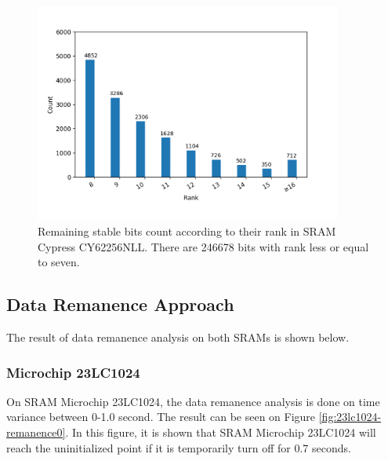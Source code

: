 \begin{figure}[tph!]
    \centerline{\includegraphics[width={0.9\textwidth}]{images/cy62256nll_score_rank_bits}}
    \caption{Remaining stable bits count according to their rank in SRAM Cypress CY62256NLL. There are 246678 bits with rank less or equal to seven.}
    \label{fig:cy62256nll_score_rank_bits}
\end{figure}

\subsection{Data Remanence Approach}

The result of data remanence analysis on both SRAMs is shown below.

\subsubsection{Microchip 23LC1024}

On SRAM Microchip 23LC1024, the data remanence analysis is done on time variance between 0-1.0 second. The result can be seen on Figure \ref{fig:23lc1024-remanence0}. In this figure, it is shown that
SRAM Microchip 23LC1024 will reach the uninitialized point if it is temporarily turn off for 0.7 seconds.

